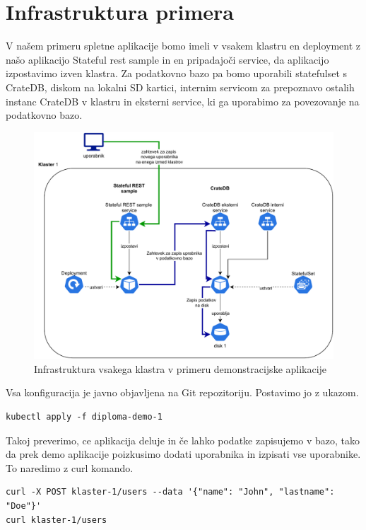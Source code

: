 \documentclass[a4paper, 12pt]{book}
\begin{document}
\section{Infrastruktura primera}
V našem primeru spletne aplikacije bomo imeli v vsakem klastru en deployment z našo aplikacijo Stateful rest sample in en pripadajoči service, da aplikacijo izpostavimo izven klastra.
Za podatkovno bazo pa bomo uporabili statefulset s CrateDB, diskom na lokalni SD kartici, internim servicom za prepoznavo ostalih instanc CrateDB v klastru in eksterni service, ki ga uporabimo za povezovanje na podatkovno bazo.
\begin{figure}[h]
\begin{center}
\includegraphics[width=1.0\textwidth]{images/infrastructure-example.pdf}
\end{center}
\caption{Infrastruktura vsakega klastra v primeru demonstracijske aplikacije}
\label{primer-uporabe-helm-predloge-argo-cd}
\end{figure}
Vsa konfiguracija je javno objavljena na Git repozitoriju\cite{git-diploma}. Postavimo jo z ukazom.
\begin{verbatim}
kubectl apply -f diploma-demo-1
\end{verbatim}
Takoj preverimo, ce aplikacija deluje in če lahko podatke zapisujemo v bazo, tako da prek demo aplikacije poizkusimo dodati uporabnika in izpisati vse uporabnike. To naredimo z curl komando.
\begin{verbatim}
curl -X POST klaster-1/users --data '{"name": "John", "lastname": "Doe"}'
curl klaster-1/users
\end{verbatim}
\end{document}
